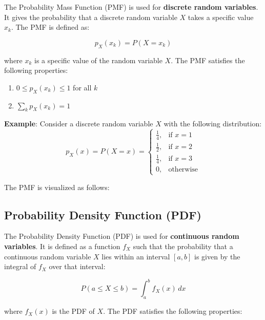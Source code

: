 \documentclass[twoside]{book}
\begin{document}
The {Probability Mass Function (PMF)} is used for \textbf{discrete random variables}. It gives the probability that a discrete random variable \( X \) takes a specific value \( x_k \). The PMF is defined as:
\begin{textbox}
\[
p_X(x_k) = P(X = x_k)
\]
\end{textbox}
where \( x_k \) is a specific value of the random variable \( X \). The PMF satisfies the following properties:

\begin{enumerate}
    \item \( 0 \leq p_X(x_k) \leq 1 \) for all \( k \)
    \item \( \sum_{k} p_X(x_k) = 1 \)
\end{enumerate}

\textbf{Example}: Consider a discrete random variable \( X \) with the following distribution:
\[
p_X(x) = P(X = x) = 
\begin{cases}
\frac{1}{4}, & \text{if } x = 1 \\
\frac{1}{2}, & \text{if } x = 2 \\
\frac{1}{4}, & \text{if } x = 3 \\
0, & \text{otherwise}
\end{cases}
\]

The PMF is visualized as follows:

\begin{center}
\end{center}

\subsection{Probability Density Function (PDF)}

The {Probability Density Function (PDF)} is used for \textbf{continuous random variables}. It is defined as a function $f_X$ such that the probability that a continuous random variable \( X \) lies within an interval \( [a, b] \) is given by the integral of $f_X$ over that interval:
\begin{textbox}
\[
P(a \leq X \leq b) = \int_a^b f_X(x) \, dx
\]
\end{textbox}
where \( f_X(x) \) is the PDF of \( X \). The PDF satisfies the following properties:
\end{document}
